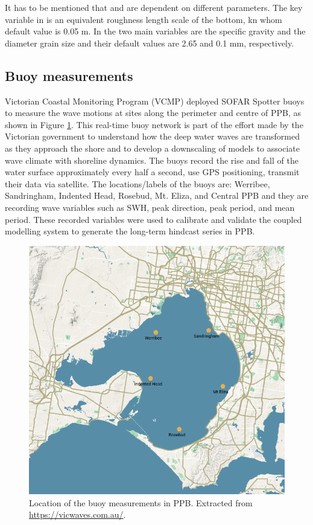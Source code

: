 \documentclass[12pt]{article}
\begin{document}
It has to be mentioned that \textcite{Madsen_Poon_Graber_1988} and \textcite{Smith2011} are dependent on different parameters. The key variable in \textcite{Madsen_Poon_Graber_1988} is an equivalent roughness length scale of the bottom, kn whom default value is 0.05 m. In \textcite{Smith2011} the two main variables are the specific gravity and the diameter grain size and their default values are 2.65 and 0.1 mm, respectively.

\subsection{Buoy measurements}

Victorian Coastal Monitoring Program (VCMP) deployed SOFAR Spotter buoys to measure the wave motions at sites along the perimeter and centre of PPB, as shown in Figure \ref{fig:buoy_measurements}. This real-time buoy network is part of the effort made by the Victorian government to understand how the deep water waves are transformed as they approach the shore and to develop a downscaling of models to associate wave climate with shoreline dynamics. The buoys record the rise and fall of the water surface approximately every half a second, use GPS positioning, transmit their data via satellite. The locations/labels of the buoys are: Werribee, Sandringham, Indented Head, Rosebud, Mt. Eliza, and Central PPB and they are recording wave variables such as SWH, peak direction, peak period, and mean period. These recorded variables were used to calibrate and validate the coupled modelling system to generate the long-term hindcast series in PPB.

\begin{figure}[h]
\centering
  \includegraphics[scale=0.3]{plots/maps/vicwaves_buoy_locations.png}
  \caption{Location of the buoy measurements in PPB. Extracted from \url{https://vicwaves.com.au/}.}
  \label{fig:buoy_measurements}
\end{figure}
\end{document}
